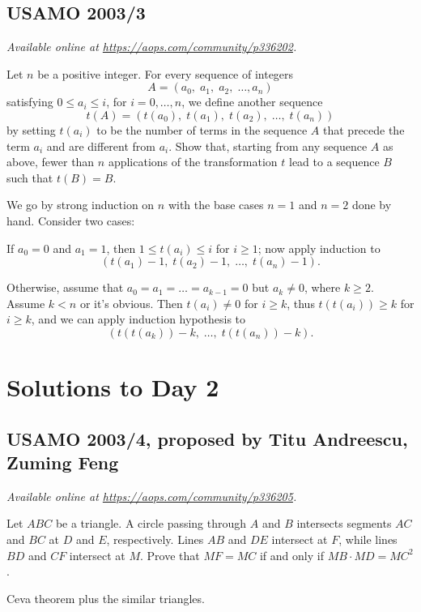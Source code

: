\documentclass[11pt]{scrartcl}
\begin{document}
\subsection{USAMO 2003/3}
\textsl{Available online at \url{https://aops.com/community/p336202}.}
\begin{mdframed}[style=mdpurplebox,frametitle={Problem statement}]
Let $n$ be a positive integer.
For every sequence of integers
\[ A = (a_0, \; a_1, \; a_2, \; \dots, a_n) \]
satisfying $0 \le a_i \le i$, for $i=0,\dots,n$,
we define another sequence
\[ t(A)= (t(a_0), \; t(a_1), \; t(a_2), \; \dots, \; t(a_n)) \]
by setting $t(a_i)$ to be the number of terms in the
sequence $A$ that precede the term $a_i$ and are different from $a_i$.
Show that, starting from any sequence $A$ as above,
fewer than $n$ applications of the  transformation $t$
lead to a sequence $B$ such that $t(B) = B$.
\end{mdframed}
We go by strong induction on $n$
with the base cases $n=1$ and $n=2$ done by hand.
Consider two cases:
\begin{itemize}
\ii If $a_0 = 0$ and $a_1 = 1$,
then $1 \le t(a_i) \le i$ for $i \ge 1$;
now apply induction to
\[ \left(t(a_1)-1, \; t(a_2)-1, \;
  \dots, \; t(a_n)-1\right). \]

\ii Otherwise, assume that $a_0 = a_1 = \dots = a_{k-1} = 0$
but $a_k \neq 0$, where $k \ge 2$.
Assume $k < n$ or it's obvious.
Then $t(a_i) \neq 0$ for $i \ge k$,
thus $t(t(a_i)) \ge k$ for $i \ge k$,
and we can apply induction hypothesis to
\[ \left( t(t(a_k))-k, \; \dots,
  \; t(t(a_n))-k \right). \]
\end{itemize}
\pagebreak

\section{Solutions to Day 2}
\subsection{USAMO 2003/4, proposed by Titu Andreescu, Zuming Feng}
\textsl{Available online at \url{https://aops.com/community/p336205}.}
\begin{mdframed}[style=mdpurplebox,frametitle={Problem statement}]
Let $ABC$ be a triangle.
A circle passing through $A$ and $B$
intersects segments $AC$ and $BC$ at $D$ and $E$, respectively.
Lines $AB$ and $DE$ intersect at $F$,
while lines $BD$ and $CF$ intersect at $M$.
Prove that $MF = MC$ if and only if $MB \cdot MD = MC^2$.
\end{mdframed}
Ceva theorem plus the similar triangles.
\end{document}
